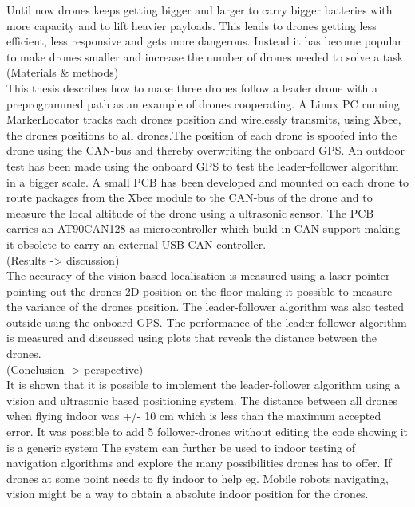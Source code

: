 Until now drones keeps getting bigger and larger to carry bigger batteries with more capacity and to lift heavier payloads. This leads to drones getting less efficient, less responsive and gets more dangerous. Instead it has become popular to make drones smaller and increase the number of drones needed to solve a task. \\

(Materials \& methods) \\
This thesis describes how to make three drones follow a leader drone with a preprogrammed path as an example of drones cooperating. A Linux PC running MarkerLocator tracks each drones position and wirelessly transmits, using Xbee, the drones positions to all drones.The position of each drone is spoofed into the drone using the CAN-bus and thereby overwriting the onboard GPS. An outdoor test has been made using the onboard GPS to test the leader-follower algorithm in a bigger scale. A small PCB has been developed and mounted on each drone to route packages from the Xbee module to the CAN-bus of the drone and to measure the local altitude of the drone using a ultrasonic sensor. The PCB carries an AT90CAN128 as microcontroller which build-in CAN support making it obsolete to carry an external USB CAN-controller.\\


(Results -> discussion)\\
The accuracy of the vision based localisation is measured using a laser pointer pointing out the drones 2D position on the floor making it possible to measure the variance of the drones position. The leader-follower algorithm was also tested outside using the onboard GPS. The performance of the leader-follower algorithm is measured and discussed using plots that reveals the distance between the drones.\\

(Conclusion -> perspective)\\
It is shown that it is possible to implement the leader-follower algorithm using a vision and ultrasonic based positioning system. The distance between all drones when flying indoor was +/- 10 cm which is less than the maximum accepted error. It was possible to add 5 follower-drones without editing the code showing it is a generic system The system can further be used to indoor testing of navigation algorithms and explore the many possibilities drones has to offer. If drones at some point needs to fly indoor to help eg. Mobile robots navigating, vision might be a way to obtain a absolute indoor position for the drones.